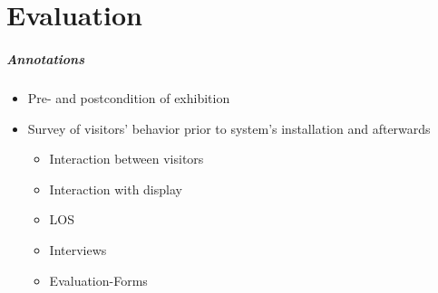\chapter{Evaluation}
\label{evaluation}

\paragraph{Annotations}

\begin{itemize}
	\item Pre- and postcondition of exhibition
	\item Survey of visitors' behavior prior to system's installation and afterwards
	\begin{itemize}
		\item Interaction between visitors
		\item Interaction with display
		\item \ac{LOS}
		\item Interviews
		\item Evaluation-Forms
	\end{itemize}
\end{itemize}

